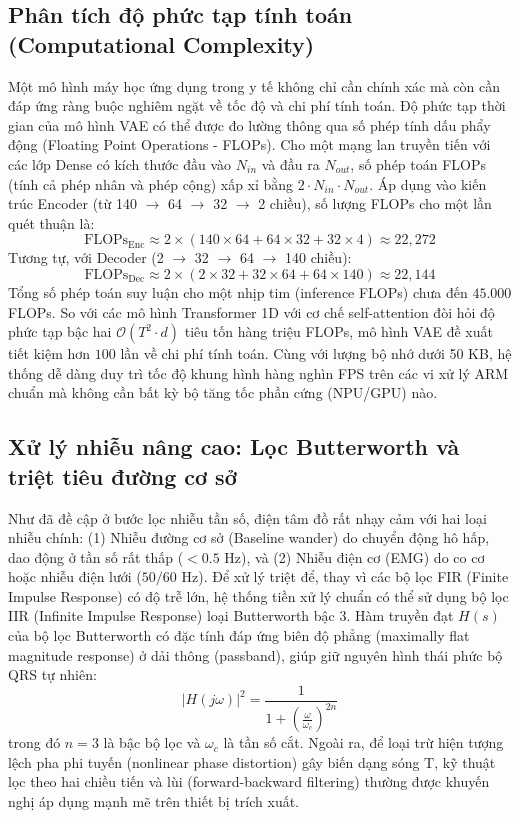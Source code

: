 \documentclass[conference]{IEEEtran}
\begin{document}
\subsection{Phân tích độ phức tạp tính toán (Computational Complexity)}
Một mô hình máy học ứng dụng trong y tế không chỉ cần chính xác mà còn cần đáp ứng ràng buộc nghiêm ngặt về tốc độ và chi phí tính toán. Độ phức tạp thời gian của mô hình VAE có thể được đo lường thông qua số phép tính dấu phẩy động (Floating Point Operations - FLOPs).
Cho một mạng lan truyền tiến với các lớp Dense có kích thước đầu vào $N_{in}$ và đầu ra $N_{out}$, số phép toán FLOPs (tính cả phép nhân và phép cộng) xấp xỉ bằng $2 \cdot N_{in} \cdot N_{out}$. 
Áp dụng vào kiến trúc Encoder (từ 140 $\rightarrow$ 64 $\rightarrow$ 32 $\rightarrow$ 2 chiều), số lượng FLOPs cho một lần quét thuận là:
\begin{equation}
\text{FLOPs}_{\text{Enc}} \approx 2 \times (140 \times 64 + 64 \times 32 + 32 \times 4) \approx 22{,}272
\end{equation}
Tương tự, với Decoder (2 $\rightarrow$ 32 $\rightarrow$ 64 $\rightarrow$ 140 chiều):
\begin{equation}
\text{FLOPs}_{\text{Dec}} \approx 2 \times (2 \times 32 + 32 \times 64 + 64 \times 140) \approx 22{,}144
\end{equation}
Tổng số phép toán suy luận cho một nhịp tim (inference FLOPs) chưa đến $45.000$ FLOPs. So với các mô hình Transformer 1D với cơ chế self-attention đòi hỏi độ phức tạp bậc hai $\mathcal{O}(T^2 \cdot d)$ tiêu tốn hàng triệu FLOPs, mô hình VAE đề xuất tiết kiệm hơn $100$ lần về chi phí tính toán. Cùng với lượng bộ nhớ dưới 50 KB, hệ thống dễ dàng duy trì tốc độ khung hình hàng nghìn FPS trên các vi xử lý ARM chuẩn mà không cần bất kỳ bộ tăng tốc phần cứng (NPU/GPU) nào.

\subsection{Xử lý nhiễu nâng cao: Lọc Butterworth và triệt tiêu đường cơ sở}
Như đã đề cập ở bước lọc nhiễu tần số, điện tâm đồ rất nhạy cảm với hai loại nhiễu chính: (1) Nhiễu đường cơ sở (Baseline wander) do chuyển động hô hấp, dao động ở tần số rất thấp ($<0.5$ Hz), và (2) Nhiễu điện cơ (EMG) do co cơ hoặc nhiễu điện lưới ($50/60$ Hz). Để xử lý triệt để, thay vì các bộ lọc FIR (Finite Impulse Response) có độ trễ lớn, hệ thống tiền xử lý chuẩn có thể sử dụng bộ lọc IIR (Infinite Impulse Response) loại Butterworth bậc 3. 
Hàm truyền đạt $H(s)$ của bộ lọc Butterworth có đặc tính đáp ứng biên độ phẳng (maximally flat magnitude response) ở dải thông (passband), giúp giữ nguyên hình thái phức bộ QRS tự nhiên:
\begin{equation}
|H(j\omega)|^2 = \frac{1}{1 + \left(\frac{\omega}{\omega_c}\right)^{2n}}
\end{equation}
trong đó $n=3$ là bậc bộ lọc và $\omega_c$ là tần số cắt. Ngoài ra, để loại trừ hiện tượng lệch pha phi tuyến (nonlinear phase distortion) gây biến dạng sóng T, kỹ thuật lọc theo hai chiều tiến và lùi (forward-backward filtering) thường được khuyến nghị áp dụng mạnh mẽ trên thiết bị trích xuất.
\end{document}
